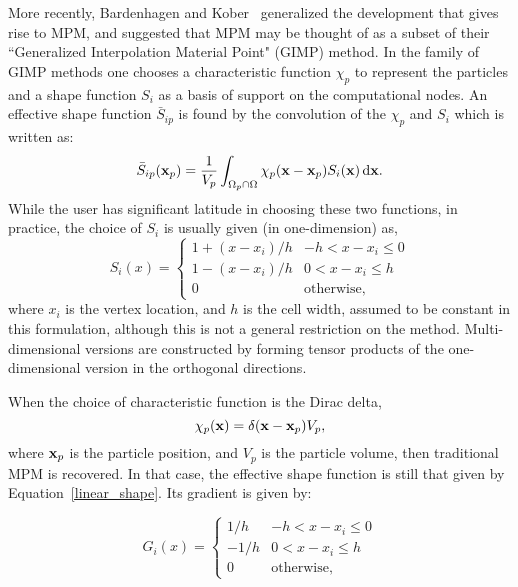 More recently, Bardenhagen and Kober~\cite{bardgimp} generalized the
development that gives rise to MPM, and suggested that MPM
may be thought of as a subset of their ``Generalized Interpolation
Material Point" (GIMP) method.  In the family of GIMP methods
one chooses a characteristic function $\chi_p$ to represent
the particles and a shape function $S_i$ as a basis of support on the
computational nodes.  An effective shape function $\bar{S}_{ip}$  is found
by the convolution of the $\chi_p$ and $S_i$ which is written as:
\begin{equation}
\bar{S}_{ip}(\bfx_p) = \frac{1}{V_p}  \int_{\Omega_p \cap \Omega} \chi_p(\bfx - \bfx_p) S_i(\bfx)\,\mathrm{d}\bfx .
\label{effectiveS}
\end{equation}
While the user has significant latitude in choosing
these two functions, in practice, the choice of $S_i$ is usually given
(in one-dimension) as,
\begin{equation}
S_i\left(x\right) = \begin{cases} 1 + {\left(x-x_i\right) / h} & {-h < x-x_i \le 0} \\
                    1 - {\left(x-x_i\right) / h} & {0  < x-x_i \le h} \\
                    0 & \text{otherwise},
       \end{cases}
\label{linear_shape}
\end{equation}
where $x_i$ is the vertex location, and $h$ is the cell width, 
assumed to be constant in this formulation, 
although this is not a general restriction on the method.
Multi-dimensional versions are constructed by forming tensor products of the
one-dimensional version in the orthogonal directions.  

When the choice of characteristic function is the Dirac delta,
\begin{equation}
\chi_p(\bfx) = \delta(\bfx-\bfx_p)V_p , \label{MPM_char}
\end{equation}
where $\bfx_p$ is the particle position, and $V_p$ is the particle volume,
then traditional MPM is recovered.  In that case, the effective shape function
is still that given by Equation~\ref{linear_shape}.  Its gradient is given by:

\begin{equation}
G_i\left(x\right) = \begin{cases} {1 / h} & {-h < x-x_i \le 0} \\
                    {-1 / h} & {0  < x-x_i \le h} \\
                    0 & \text{otherwise},
       \end{cases}
\label{linear_shape_grad}
\end{equation}

